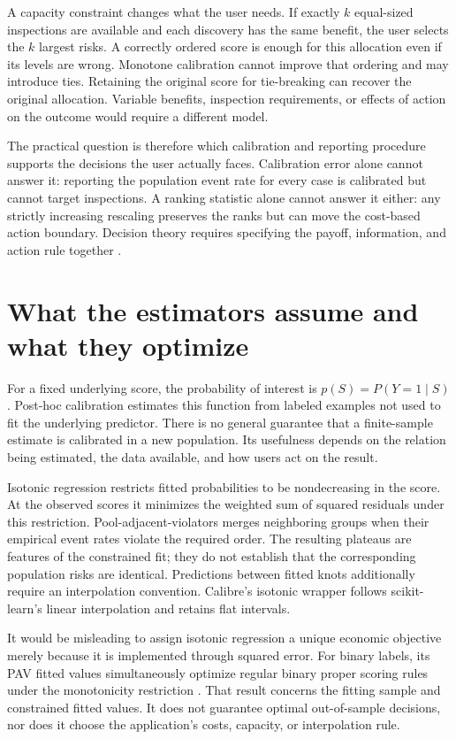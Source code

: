 \documentclass[11pt]{article}
\begin{document}
A capacity constraint changes what the user needs. If exactly $k$ equal-sized inspections are available and each discovery has the same benefit, the user selects the $k$ largest risks. A correctly ordered score is enough for this allocation even if its levels are wrong. Monotone calibration cannot improve that ordering and may introduce ties. Retaining the original score for tie-breaking can recover the original allocation. Variable benefits, inspection requirements, or effects of action on the outcome would require a different model.

The practical question is therefore which calibration and reporting procedure supports the decisions the user actually faces. Calibration error alone cannot answer it: reporting the population event rate for every case is calibrated but cannot target inspections. A ranking statistic alone cannot answer it either: any strictly increasing rescaling preserves the ranks but can move the cost-based action boundary. Decision theory requires specifying the payoff, information, and action rule together \citep{hullman2025experiments,hullman2024enough}.

\clearpage
\section{What the estimators assume and what they optimize}
For a fixed underlying score, the probability of interest is $p(S)=P(Y=1\mid S)$. Post-hoc calibration estimates this function from labeled examples not used to fit the underlying predictor. There is no general guarantee that a finite-sample estimate is calibrated in a new population. Its usefulness depends on the relation being estimated, the data available, and how users act on the result.

Isotonic regression restricts fitted probabilities to be nondecreasing in the score. At the observed scores it minimizes the weighted sum of squared residuals under this restriction. Pool-adjacent-violators merges neighboring groups when their empirical event rates violate the required order. The resulting plateaus are features of the constrained fit; they do not establish that the corresponding population risks are identical. Predictions between fitted knots additionally require an interpolation convention. Calibre's isotonic wrapper follows scikit-learn's linear interpolation and retains flat intervals.

It would be misleading to assign isotonic regression a unique economic objective merely because it is implemented through squared error. For binary labels, its PAV fitted values simultaneously optimize regular binary proper scoring rules under the monotonicity restriction \citep{brummer2013}. That result concerns the fitting sample and constrained fitted values. It does not guarantee optimal out-of-sample decisions, nor does it choose the application's costs, capacity, or interpolation rule.
\end{document}
